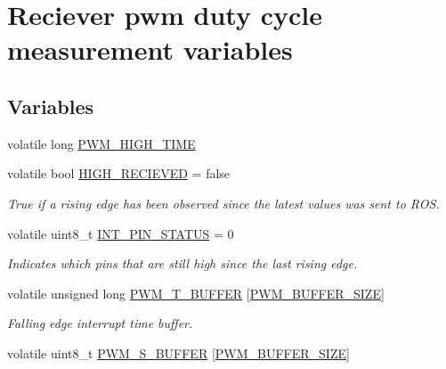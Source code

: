 \hypertarget{group__PwmMeasurtement}{}\section{Reciever pwm duty cycle measurement variables}
\label{group__PwmMeasurtement}
\subsection*{Variables}
\begin{DoxyCompactItemize}
\item 
volatile long \hyperlink{group__PwmMeasurtement_gaeb758acd90cce2a48375254eb9c2d843}{P\+W\+M\+\_\+\+H\+I\+G\+H\+\_\+\+T\+I\+ME}
\item 
volatile bool \hyperlink{group__PwmMeasurtement_ga1ca1be2c986a00d6a79e5d7d5ab1313c}{H\+I\+G\+H\+\_\+\+R\+E\+C\+I\+E\+V\+ED} = false\hypertarget{group__PwmMeasurtement_ga1ca1be2c986a00d6a79e5d7d5ab1313c}{}\label{group__PwmMeasurtement_ga1ca1be2c986a00d6a79e5d7d5ab1313c}

\begin{DoxyCompactList}\small\item\em True if a rising edge has been observed since the latest values was sent to R\+OS. \end{DoxyCompactList}\item 
volatile uint8\+\_\+t \hyperlink{group__PwmMeasurtement_ga3f84f08978073d634ef59d44eba3c32a}{I\+N\+T\+\_\+\+P\+I\+N\+\_\+\+S\+T\+A\+T\+US} = 0\hypertarget{group__PwmMeasurtement_ga3f84f08978073d634ef59d44eba3c32a}{}\label{group__PwmMeasurtement_ga3f84f08978073d634ef59d44eba3c32a}

\begin{DoxyCompactList}\small\item\em Indicates which pins that are still high since the last rising edge. \end{DoxyCompactList}\item 
volatile unsigned long \hyperlink{group__PwmMeasurtement_ga1980b7b5ba1ceabb0b5c60c9da70164e}{P\+W\+M\+\_\+\+T\+\_\+\+B\+U\+F\+F\+ER} \mbox{[}\hyperlink{group__PwmInputConstants_gae2449e7e1058591bfbfdc0901c185602}{P\+W\+M\+\_\+\+B\+U\+F\+F\+E\+R\+\_\+\+S\+I\+ZE}\mbox{]}\hypertarget{group__PwmMeasurtement_ga1980b7b5ba1ceabb0b5c60c9da70164e}{}\label{group__PwmMeasurtement_ga1980b7b5ba1ceabb0b5c60c9da70164e}

\begin{DoxyCompactList}\small\item\em Falling edge interrupt time buffer. \end{DoxyCompactList}\item 
volatile uint8\+\_\+t \hyperlink{group__PwmMeasurtement_gaed4f8ecf3e1ca2d8bfa8904a43729f57}{P\+W\+M\+\_\+\+S\+\_\+\+B\+U\+F\+F\+ER} \mbox{[}\hyperlink{group__PwmInputConstants_gae2449e7e1058591bfbfdc0901c185602}{P\+W\+M\+\_\+\+B\+U\+F\+F\+E\+R\+\_\+\+S\+I\+ZE}\mbox{]}\hypertarget{group__PwmMeasurtement_gaed4f8ecf3e1ca2d8bfa8904a43729f57}{}\label{group__PwmMeasurtement_gaed4f8ecf3e1ca2d8bfa8904a43729f57}


\end{DoxyCompactItemize}
